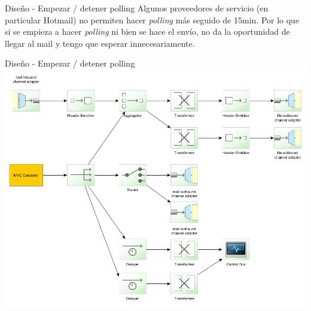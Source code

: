 \documentclass{beamer}
\begin{document}
\begin{frame}{Diseño - Empezar / detener polling}
Algunos proveedores de servicio (en particular Hotmail) no permiten hacer \textit{polling} más seguido de 15min. Por lo que si se empieza a hacer \textit{polling} ni bien se hace el envío, no da la oportunidad de llegar al mail y tengo que esperar innecesariamente.
\end{frame}

\begin{frame}{Diseño - Empezar / detener polling}
\includegraphics[width=0.8\linewidth]{sp-int-15}
\end{frame}
\end{document}
